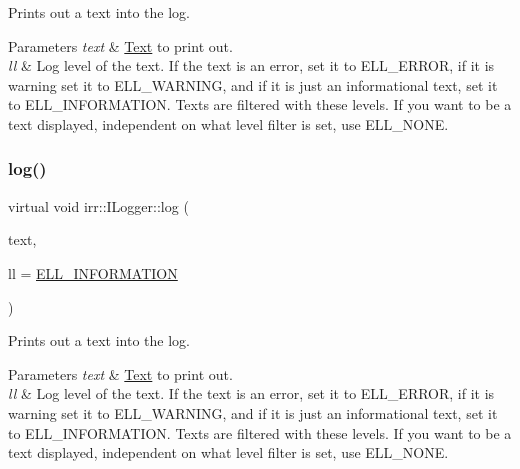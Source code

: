 Prints out a text into the log. 


\begin{DoxyParams}{Parameters}
{\em text} & \hyperlink{classText}{Text} to print out. \\
\hline
{\em ll} & Log level of the text. If the text is an error, set it to E\+L\+L\+\_\+\+E\+R\+R\+OR, if it is warning set it to E\+L\+L\+\_\+\+W\+A\+R\+N\+I\+NG, and if it is just an informational text, set it to E\+L\+L\+\_\+\+I\+N\+F\+O\+R\+M\+A\+T\+I\+ON. Texts are filtered with these levels. If you want to be a text displayed, independent on what level filter is set, use E\+L\+L\+\_\+\+N\+O\+NE. \\
\hline
\end{DoxyParams}
\mbox{\label{classirr_1_1ILogger_a40af57afdc28c5e890920cb448663ff9}} 
\subsubsection{\texorpdfstring{log()}{log()}\hspace{0.1cm}{\footnotesize\ttfamily [8/8]}}
{\footnotesize\ttfamily virtual void irr\+::\+I\+Logger\+::log (\begin{DoxyParamCaption}\item[{const wchar\+\_\+t $\ast$}]{text,  }\item[{\hyperlink{namespaceirr_aa2d1cac68606a25ed24cfffccfa30a92}{E\+L\+O\+G\+\_\+\+L\+E\+V\+EL}}]{ll = {\ttfamily \hyperlink{namespaceirr_aa2d1cac68606a25ed24cfffccfa30a92aaed3e0f449ad8851a1bb501d4df1c0e7}{E\+L\+L\+\_\+\+I\+N\+F\+O\+R\+M\+A\+T\+I\+ON}} }\end{DoxyParamCaption})\hspace{0.3cm}{\ttfamily [pure virtual]}}



Prints out a text into the log. 


\begin{DoxyParams}{Parameters}
{\em text} & \hyperlink{classText}{Text} to print out. \\
\hline
{\em ll} & Log level of the text. If the text is an error, set it to E\+L\+L\+\_\+\+E\+R\+R\+OR, if it is warning set it to E\+L\+L\+\_\+\+W\+A\+R\+N\+I\+NG, and if it is just an informational text, set it to E\+L\+L\+\_\+\+I\+N\+F\+O\+R\+M\+A\+T\+I\+ON. Texts are filtered with these levels. If you want to be a text displayed, independent on what level filter is set, use E\+L\+L\+\_\+\+N\+O\+NE. \\
\hline
\end{DoxyParams}
\mbox{\label{classirr_1_1ILogger_a226a6f71f76970f2d846a10599f2e5ec}} 
